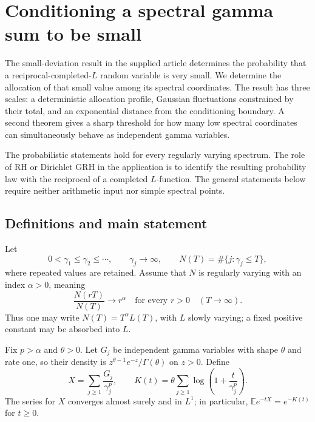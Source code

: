 
\section{Conditioning a spectral gamma sum to be small}
\label{mc:sec:general}

The small-deviation result in the supplied article determines the probability
that a reciprocal-completed-$L$ random variable is very small.  We determine
the allocation of that small value among its spectral coordinates.  The
result has three scales: a deterministic allocation profile, Gaussian
fluctuations constrained by their total, and an exponential distance from
the conditioning boundary.  A second theorem gives a sharp threshold for
how many low spectral coordinates can simultaneously behave as independent
gamma variables.

The probabilistic statements hold for every regularly varying spectrum.
The role of RH or Dirichlet GRH in the application is to identify the
resulting probability law with the reciprocal of a completed $L$-function.
The general statements below require neither arithmetic input nor simple
spectral points.

\subsection{Definitions and main statement}

Let
\[
 0<\gamma_1\leq\gamma_2\leq\cdots,\qquad \gamma_j\longrightarrow\infty,
 \qquad N(T)=\#\{j:\gamma_j\leq T\},
\]
where repeated values are retained.  Assume that $N$ is regularly varying
with an index $\alpha>0$, meaning
\begin{equation}\label{mc:eq:RV}
 \frac{N(rT)}{N(T)}\longrightarrow r^\alpha
 \quad\text{for every }r>0\quad(T\longrightarrow\infty).
\end{equation}
Thus one may write $N(T)=T^\alpha L(T)$, with $L$ slowly varying;
a fixed positive constant may be absorbed into $L$.

Fix $p>\alpha$ and $\theta>0$.  Let $G_j$ be independent gamma variables
with shape $\theta$ and rate one, so their density is
$z^{\theta-1}e^{-z}/\Gamma(\theta)$ on $z>0$.  Define
\begin{equation}\label{mc:eq:XK}
 X=\sum_{j\geq1}\frac{G_j}{\gamma_j^p},\qquad
 K(t)=\theta\sum_{j\geq1}\log\left(1+\frac{t}{\gamma_j^p}\right).
\end{equation}
The series for $X$ converges almost surely and in $L^1$; in particular,
$\mathbb E e^{-tX}=e^{-K(t)}$ for $t\geq0$.

